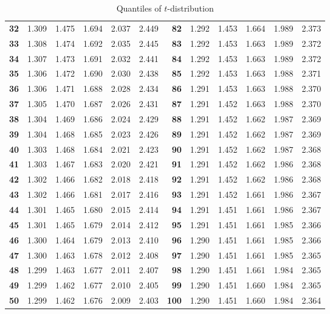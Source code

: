 \documentclass[captions=tableheading, 12pt, headings=small, parskip=half]{scrartcl}
\begin{document}
\begin{table}[ht]
{\begin{tabular}{>{\bfseries}rd{1.3}d{1.3}d{1.3}d{2.3}d{2.3}|>{\bfseries}rd{1.3}d{1.3}d{1.3}d{2.3}d{2.3}}
			32 & 1.309 & 1.475 & 1.694 & 2.037 & 2.449 & 82 & 1.292 & 1.453 & 1.664 & 1.989 & 2.373   \\ 
			33 & 1.308 & 1.474 & 1.692 & 2.035 & 2.445 & 83 & 1.292 & 1.453 & 1.663 & 1.989 & 2.372  \\ 
			34 & 1.307 & 1.473 & 1.691 & 2.032 & 2.441 & 84 & 1.292 & 1.453 & 1.663 & 1.989 & 2.372   \\ 
			35 & 1.306 & 1.472 & 1.690 & 2.030 & 2.438 & 85 & 1.292 & 1.453 & 1.663 & 1.988 & 2.371   \\ 
			36 & 1.306 & 1.471 & 1.688 & 2.028 & 2.434 & 86 & 1.291 & 1.453 & 1.663 & 1.988 & 2.370   \\ 
			37 & 1.305 & 1.470 & 1.687 & 2.026 & 2.431 & 87 & 1.291 & 1.452 & 1.663 & 1.988 & 2.370   \\ 
			38 & 1.304 & 1.469 & 1.686 & 2.024 & 2.429 & 88 & 1.291 & 1.452 & 1.662 & 1.987 & 2.369   \\ 
			39 & 1.304 & 1.468 & 1.685 & 2.023 & 2.426 & 89 & 1.291 & 1.452 & 1.662 & 1.987 & 2.369  \\ 
			40 & 1.303 & 1.468 & 1.684 & 2.021 & 2.423 & 90 & 1.291 & 1.452 & 1.662 & 1.987 & 2.368   \\ 
			41 & 1.303 & 1.467 & 1.683 & 2.020 & 2.421 & 91 & 1.291 & 1.452 & 1.662 & 1.986 & 2.368   \\ 
			42 & 1.302 & 1.466 & 1.682 & 2.018 & 2.418 & 92 & 1.291 & 1.452 & 1.662 & 1.986 & 2.368  \\ 
			43 & 1.302 & 1.466 & 1.681 & 2.017 & 2.416 & 93 & 1.291 & 1.452 & 1.661 & 1.986 & 2.367  \\ 
			44 & 1.301 & 1.465 & 1.680 & 2.015 & 2.414 & 94 & 1.291 & 1.451 & 1.661 & 1.986 & 2.367   \\ 
			45 & 1.301 & 1.465 & 1.679 & 2.014 & 2.412 & 95 & 1.291 & 1.451 & 1.661 & 1.985 & 2.366   \\ 
			46 & 1.300 & 1.464 & 1.679 & 2.013 & 2.410 & 96 & 1.290 & 1.451 & 1.661 & 1.985 & 2.366   \\ 
			47 & 1.300 & 1.463 & 1.678 & 2.012 & 2.408 & 97 & 1.290 & 1.451 & 1.661 & 1.985 & 2.365  \\ 
			48 & 1.299 & 1.463 & 1.677 & 2.011 & 2.407 & 98 & 1.290 & 1.451 & 1.661 & 1.984 & 2.365 \\ 
			49 & 1.299 & 1.462 & 1.677 & 2.010 & 2.405 & 99 & 1.290 & 1.451 & 1.660 & 1.984 & 2.365   \\ 
			50 & 1.299 & 1.462 & 1.676 & 2.009 & 2.403 & 100 & 1.290 & 1.451 & 1.660 & 1.984 & 2.364   \\ 
			\bottomrule
			\bottomrule
	\end{tabular}}
	\caption{Quantiles of $t$-distribution}
\end{table}
\end{document}
